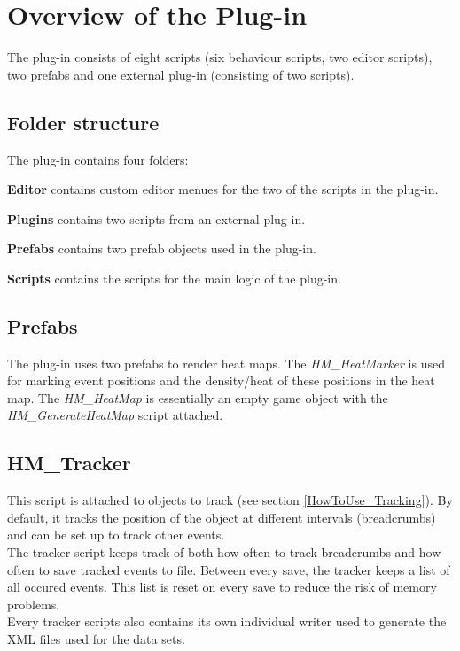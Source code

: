 \section{Overview of the Plug-in}
\label{CO}
The plug-in consists of eight scripts (six behaviour scripts, two editor scripts), two prefabs and one external plug-in (consisting of two scripts). 

\subsection{Folder structure}
\label{CO_FStructure}
The plug-in contains four folders:
\begin{my_itemize}
\item \textbf{Editor} contains custom editor menues for the two of the scripts in the plug-in.
\item \textbf{Plugins} contains two scripts from an external plug-in.
\item \textbf{Prefabs} contains two prefab objects used in the plug-in.
\item \textbf{Scripts} contains the scripts for the main logic of the plug-in.
\end{my_itemize}

\subsection{Prefabs}
\label{CO_Prefabs}
The plug-in uses two prefabs to render heat maps. The \textit{HM\_HeatMarker} is used for marking event positions and the density/heat of these positions in the heat map. The \textit{HM\_HeatMap} is essentially an empty game object with the \textit{HM\_GenerateHeatMap} script attached.

\subsection{HM\_Tracker}
\label{CO_Tracker}
This script is attached to objects to track (see section \ref{HowToUse_Tracking}). By default, it tracks the position of the object at different intervals (breadcrumbs) and can be set up to track other events. 
\\The tracker script keeps track of both how often to track breadcrumbs and how often to save tracked events to file. Between every save, the tracker keeps a list of all occured events. This list is reset on every save to reduce the risk of memory problems. 
\\Every tracker scripts also contains its own individual writer used to generate the XML files used for the data sets.

